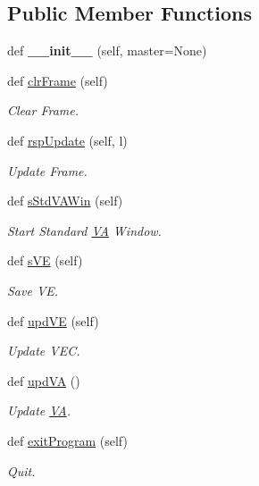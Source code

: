 \subsection*{Public Member Functions}
\begin{DoxyCompactItemize}
\item 
\mbox{\label{classebfgen_1_1mainWindow_ac92f39d5be05665356ac78db51336fb6}} 
def {\bfseries \+\_\+\+\_\+init\+\_\+\+\_\+} (self, master=None)
\item 
def \hyperlink{classebfgen_1_1mainWindow_adef0b170df57fd1be0cca767f90e75d9}{clr\+Frame} (self)
\begin{DoxyCompactList}\small\item\em Clear Frame. \end{DoxyCompactList}\item 
def \hyperlink{classebfgen_1_1mainWindow_a7422402e0cb017bfc763f23e448fb966}{rsp\+Update} (self, l)
\begin{DoxyCompactList}\small\item\em Update Frame. \end{DoxyCompactList}\item 
def \hyperlink{classebfgen_1_1mainWindow_ad6fe59c3a2a9e762160dd80263d52f9b}{s\+Std\+V\+A\+Win} (self)
\begin{DoxyCompactList}\small\item\em Start Standard \hyperlink{classebfgen_1_1VA}{VA} Window. \end{DoxyCompactList}\item 
def \hyperlink{classebfgen_1_1mainWindow_a95a4973e95a3ca29f3d4a39aaf0d0aa0}{s\+VE} (self)
\begin{DoxyCompactList}\small\item\em Save VE. \end{DoxyCompactList}\item 
def \hyperlink{classebfgen_1_1mainWindow_a788d4b2795b776cc1cf98e8f1595d919}{upd\+VE} (self)
\begin{DoxyCompactList}\small\item\em Update V\+EC. \end{DoxyCompactList}\item 
def \hyperlink{classebfgen_1_1mainWindow_a062c7d1268146c82264a87132c0f4265}{upd\+VA} ()
\begin{DoxyCompactList}\small\item\em Update \hyperlink{classebfgen_1_1VA}{VA}. \end{DoxyCompactList}\item 
\mbox{\label{classebfgen_1_1mainWindow_a9b0a26a4f44410c80e406846ed4ae1de}} 
def \hyperlink{classebfgen_1_1mainWindow_a9b0a26a4f44410c80e406846ed4ae1de}{exit\+Program} (self)
\begin{DoxyCompactList}\small\item\em Quit. \end{DoxyCompactList}\end{DoxyCompactItemize}

